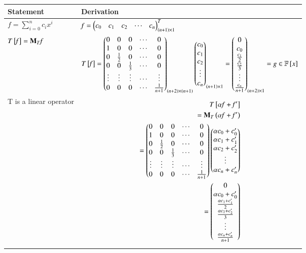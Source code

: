 \documentclass[journal,12pt,twocolumn]{IEEEtran}
\numberwithin{table}{section}
\begin{document}
\renewcommand{\thetable}{2}
\begin{table*}[ht!]
\begin{center}
\begin{tabular}{|l|l|}
\hline
\textbf{Statement} & \textbf{Derivation} \\[0.5ex]
\hline
$\mathit{f}=\sum \limits_{i=0}^n c_i x^i$ & $\mathit{f}=\begin{pmatrix}c_0&c_1&c_2&\cdots&c_n\end{pmatrix}^T_{\left(n+1\right)\times1}$
\\ [0.5ex] 
\hline
$T{}\left[\mathit{f}\right]=\mathbf{M}_T\mathit{f}$ & $T{}\left[\mathit{f}\right]=
\begin{pmatrix}0&0&0&\cdots&0\\1&0&0&\cdots&0\\0&\frac{1}{2}&0&\cdots&0\\0&0&\frac{1}{3}&\cdots&0\\\vdots&\vdots&\vdots&\cdots&\vdots\\0&0&0&\cdots&\frac{1}{n+1}\end{pmatrix}_{\left(n+2\right)\times\left(n+1\right)}
\begin{pmatrix}c_0\\c_1\\c_2\\\vdots\\c_n\end{pmatrix}_{\left(n+1\right)\times1}
=\begin{pmatrix}0\\c_0\\\frac{c_1}{2}\\\frac{c_2}{3}\\\vdots\\\frac{c_n}{n+1}\end{pmatrix}_{\left(n+2\right)\times1}=\mathit{g}\in \mathbb{F}{}\left[x\right]$
\\ [0.5ex] 
\hline
T is a linear operator & 
\parbox{10cm}{\begin{align}
T\sbrak{\alpha\mathit{f}+\mathit{f^\prime}}\\
=\vec{M}_T\brak{\alpha\mathit{f}+\mathit{f^\prime}}\\
=\myvec{0&0&0&\cdots&0\\1&0&0&\cdots&0\\0&\frac{1}{2}&0&\cdots&0\\0&0&\frac{1}{3}&\cdots&0\\\vdots&\vdots&\vdots&\cdots&\vdots\\0&0&0&\cdots&\frac{1}{n+1}}
\myvec{\alpha c_0+c_0^\prime\\\alpha c_1+c_1^\prime\\\alpha c_2+c_2^\prime\\\vdots\\\alpha c_n+c_n^\prime}\\
=\myvec{0\\\alpha c_0+c_0^\prime\\\frac{\alpha c_1+c_1^\prime}{2}\\\frac{\alpha c_2+c_2^\prime}{3}\\\vdots\\\frac{\alpha c_n+c_n^\prime}{n+1}}

\end{align}}
\end{tabular}
\end{center}
\end{table*}
\end{document}
